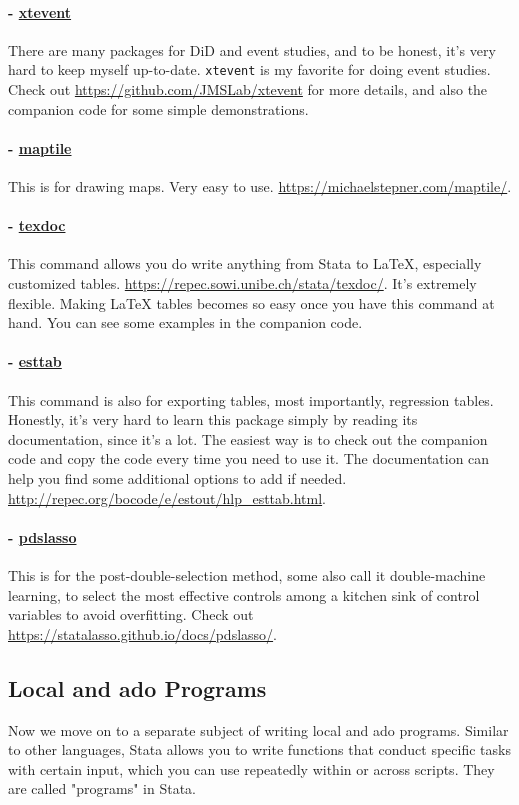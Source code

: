 \paragraph{- \underline{xtevent}} There are many packages for DiD and event studies, and to be honest, it's very hard to keep myself up-to-date. \verb|xtevent| is my favorite for doing event studies. Check out \url{https://github.com/JMSLab/xtevent} for more details, and also the companion code for some simple demonstrations. 

\paragraph{- \underline{maptile}} This is for drawing maps. Very easy to use. \url{https://michaelstepner.com/maptile/}.

\paragraph{- \underline{texdoc}} This command allows you do write anything from Stata to \LaTeX, especially customized tables. \url{https://repec.sowi.unibe.ch/stata/texdoc/}. It's extremely flexible. Making {\LaTeX} tables becomes so easy once you have this command at hand. You can see some examples in the companion code. 

\paragraph{- \underline{esttab}} This command is also for exporting tables, most importantly, regression tables. Honestly, it's very hard to learn this package simply by reading its documentation, since it's a lot. The easiest way is to check out the companion code and copy the code every time you need to use it. The documentation can help you find some additional options to add if needed. \url{http://repec.org/bocode/e/estout/hlp_esttab.html}. 

\paragraph{- \underline{pdslasso}} This is for the post-double-selection method, some also call it double-machine learning, to select the most effective controls among a kitchen sink of control variables to avoid overfitting. Check out \url{https://statalasso.github.io/docs/pdslasso/}.

\subsection{Local and ado Programs}
Now we move on to a separate subject of writing local and ado programs. Similar to other languages, Stata allows you to write functions that conduct specific tasks with certain input, which you can use repeatedly within or across scripts. They are called "programs" in Stata. 

